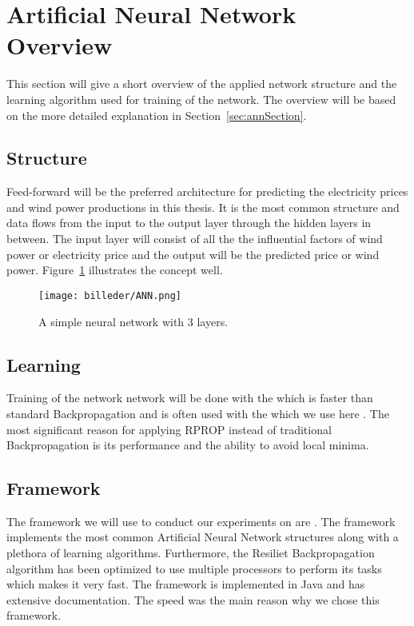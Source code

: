 \section{Artificial Neural Network Overview}
This section will give a short overview of the applied network structure and the learning algorithm used for training of the network. The overview will be based on the more detailed explanation in Section~\ref{sec:annSection}.

\subsection{Structure}
Feed-forward will be the preferred architecture for predicting the electricity prices and wind power productions in this thesis. It is the most common structure and data flows from the input to the output layer through the hidden layers in between. The input layer will consist of all the the influential factors of wind power or electricity price and the output will be the predicted price or wind power. Figure~\ref{fig:overviewAnn} illustrates the concept well.

\begin{figure}[H]
\centering
\texttt{[image: billeder/ANN.png]}
\caption{A simple neural network with 3 layers. \cite{stockForecasting}}
\label{fig:overviewAnn}
\end{figure}

\subsection{Learning}
Training of the network network will be done with the  which is faster than standard Backpropagation \cite{15} and is often used with the  which we use here \cite{17}. The most significant reason for applying RPROP instead of traditional Backpropagation is its performance and the ability to avoid local minima.

\subsection{Framework}
The framework we will use to conduct our experiments on are . The framework implements the most common Artificial Neural Network structures along with a plethora of learning algorithms. Furthermore, the Resiliet Backpropagation algorithm has been optimized to use multiple processors to perform its tasks which makes it very fast. The framework is implemented in Java and has extensive documentation. The speed was the main reason why we chose this framework.
